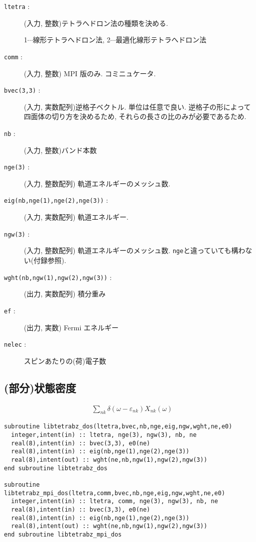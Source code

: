 \documentclass[12pt]{jarticle}
\begin{document}
\begin{description}
\item[\texttt{ltetra} : ] (入力, 整数)テトラへドロン法の種類を決める. 

  1$\cdots$線形テトラへドロン法, 
  2$\cdots$最適化線形テトラへドロン法

\item[\texttt{comm} : ] (入力, 整数) MPI 版のみ. コミニュケータ. 
\item[\texttt{bvec(3,3)} : ] (入力, 実数配列)逆格子ベクトル. 単位は任意で良い. 
  逆格子の形によって四面体の切り方を決めるため, それらの長さの比のみが必要であるため. 
\item[\texttt{nb} : ] (入力, 整数)バンド本数
\item[\texttt{nge(3)} : ] (入力, 整数配列) 軌道エネルギーのメッシュ数. 
\item[\texttt{eig(nb,nge(1),nge(2),nge(3))} : ] (入力, 実数配列) 軌道エネルギー. 
\item[\texttt{ngw(3)} : ] (入力, 整数配列) 軌道エネルギーのメッシュ数. 
  \verb|nge|と違っていても構わない(付録参照). 
\item[\texttt{wght(nb,ngw(1),ngw(2),ngw(3))} : ] (出力, 実数配列) 積分重み
\item[\texttt{ef} : ] (出力, 実数) Fermi エネルギー
\item[\texttt{nelec} : ] スピンあたりの(荷)電子数
\end{description}

\newpage

\subsection{(部分)状態密度}

\begin{align}
&\sum_{n k} \delta(\omega - \varepsilon_{n k}) X_{n k}(\omega)
\end{align}

\begin{verbatim}
subroutine libtetrabz_dos(ltetra,bvec,nb,nge,eig,ngw,wght,ne,e0)
  integer,intent(in) :: ltetra, nge(3), ngw(3), nb, ne
  real(8),intent(in) :: bvec(3,3), e0(ne)
  real(8),intent(in) :: eig(nb,nge(1),nge(2),nge(3))
  real(8),intent(out) :: wght(ne,nb,ngw(1),ngw(2),ngw(3))
end subroutine libtetrabz_dos

subroutine libtetrabz_mpi_dos(ltetra,comm,bvec,nb,nge,eig,ngw,wght,ne,e0)
  integer,intent(in) :: ltetra, comm, nge(3), ngw(3), nb, ne
  real(8),intent(in) :: bvec(3,3), e0(ne)
  real(8),intent(in) :: eig(nb,nge(1),nge(2),nge(3))
  real(8),intent(out) :: wght(ne,nb,ngw(1),ngw(2),ngw(3))
end subroutine libtetrabz_mpi_dos
\end{verbatim}
\end{document}
